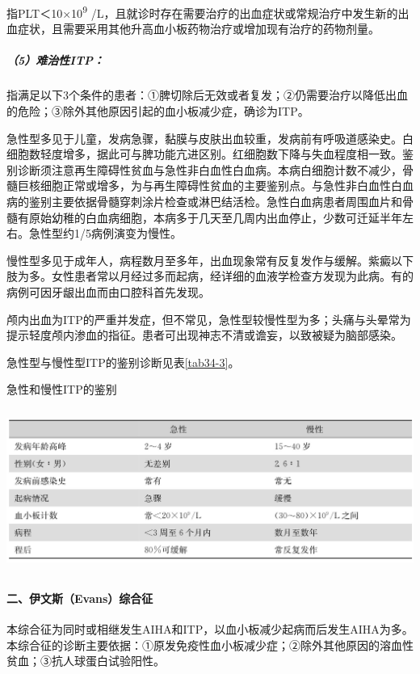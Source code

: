 指PLT＜10×10\textsuperscript{9}
/L，且就诊时存在需要治疗的出血症状或常规治疗中发生新的出血症状，且需要采用其他升高血小板药物治疗或增加现有治疗的药物剂量。

\subparagraph{（5）难治性ITP：}

指满足以下3个条件的患者：①脾切除后无效或者复发；②仍需要治疗以降低出血的危险；③除外其他原因引起的血小板减少症，确诊为ITP。

急性型多见于儿童，发病急骤，黏膜与皮肤出血较重，发病前有呼吸道感染史。白细胞数轻度增多，据此可与脾功能亢进区别。红细胞数下降与失血程度相一致。鉴别诊断须注意再生障碍性贫血与急性非白血性白血病。本病白细胞计数不减少，骨髓巨核细胞正常或增多，为与再生障碍性贫血的主要鉴别点。与急性非白血性白血病的鉴别主要依据骨髓穿刺涂片检查或淋巴结活检。急性白血病患者周围血片和骨髓有原始幼稚的白血病细胞，本病多于几天至几周内出血停止，少数可迁延半年左右。急性型约1/5病例演变为慢性。

慢性型多见于成年人，病程数月至多年，出血现象常有反复发作与缓解。紫癜以下肢为多。女性患者常以月经过多而起病，经详细的血液学检查方发现为此病。有的病例可因牙龈出血而由口腔科首先发现。

颅内出血为ITP的严重并发症，但不常见，急性型较慢性型为多；头痛与头晕常为提示轻度颅内渗血的指征。患者可出现神志不清或谵妄，以致被疑为脑部感染。

急性型与慢性型ITP的鉴别诊断见表\ref{tab34-3}。

\begin{table}[htbp]
\centering
\caption{急性和慢性ITP的鉴别}
\label{tab34-3}
\includegraphics[width=5.875in,height=2.09375in]{./images/Image00197.jpg}
\end{table}

\paragraph{二、伊文斯（Evans）综合征}

本综合征为同时或相继发生AIHA和ITP，以血小板减少起病而后发生AIHA为多。本综合征的诊断主要依据：①原发免疫性血小板减少症；②除外其他原因的溶血性贫血；③抗人球蛋白试验阳性。

